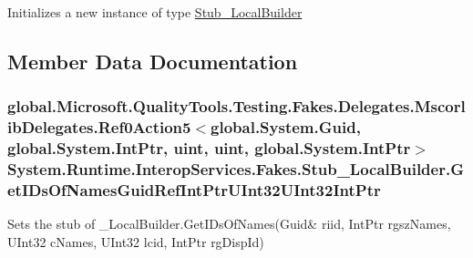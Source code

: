 Initializes a new instance of type \hyperlink{class_system_1_1_runtime_1_1_interop_services_1_1_fakes_1_1_stub___local_builder}{Stub\-\_\-\-Local\-Builder}



\subsection{Member Data Documentation}
\hypertarget{class_system_1_1_runtime_1_1_interop_services_1_1_fakes_1_1_stub___local_builder_abe1743cef8bbd5f5bdf7310bddf7ce29}{
\subsubsection[{Get\-I\-Ds\-Of\-Names\-Guid\-Ref\-Int\-Ptr\-U\-Int32\-U\-Int32\-Int\-Ptr}]{\setlength{\rightskip}{0pt plus 5cm}global.\-Microsoft.\-Quality\-Tools.\-Testing.\-Fakes.\-Delegates.\-Mscorlib\-Delegates.\-Ref0\-Action5$<$global.\-System.\-Guid, global.\-System.\-Int\-Ptr, uint, uint, global.\-System.\-Int\-Ptr$>$ System.\-Runtime.\-Interop\-Services.\-Fakes.\-Stub\-\_\-\-Local\-Builder.\-Get\-I\-Ds\-Of\-Names\-Guid\-Ref\-Int\-Ptr\-U\-Int32\-U\-Int32\-Int\-Ptr}}\label{class_system_1_1_runtime_1_1_interop_services_1_1_fakes_1_1_stub___local_builder_abe1743cef8bbd5f5bdf7310bddf7ce29}


Sets the stub of \-\_\-\-Local\-Builder.\-Get\-I\-Ds\-Of\-Names(Guid\& riid, Int\-Ptr rgsz\-Names, U\-Int32 c\-Names, U\-Int32 lcid, Int\-Ptr rg\-Disp\-Id)

